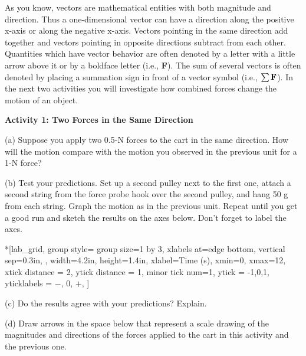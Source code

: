 As you know, vectors are mathematical entities with both magnitude and
direction. Thus a one-dimensional vector can have a direction along the positive
x-axis or along the negative x-axis. Vectors pointing in the same direction
add together and vectors pointing in opposite directions subtract from each
other. Quantities which have vector behavior are often denoted by a letter with
a little arrow above it or by a boldface letter (i.e., \textbf{F}). The sum of
several vectors is often denoted by placing a summation sign in front of a vector
symbol (i.e., \( \sum {\bf F}  \)). In the next two activities you will
investigate how combined forces change the motion of an object.

\textbf{Activity 1: Two Forces in the Same Direction}

(a) Suppose you apply two 0.5-N forces to the cart in the same direction. How
will the motion compare with the motion you observed in the previous unit for
a 1-N force?
\answerspace{20mm}

\pagebreak[3]
(b) Test your predictions. Set up a second pulley next to the first one, attach
a second string from the force probe hook over the second pulley, and hang 50
g from each string. Graph the motion as in the previous unit. Repeat until you
get a good run and sketch the results on the axes below. Don't forget to label
the axes.

\begin{lab_groupplot}*{}[lab_grid,
	group style={
		group size=1 by 3,
		xlabels at=edge bottom,
		vertical sep=0.3in,
		},
	width=4.2in,  height=1.4in,
	xlabel=Time (s),
	xmin=0, xmax=12,
	xtick distance = 2, 
	ytick distance = 1, 
	minor tick num=1,
	ytick = {-1,0,1},
	yticklabels = {$-$, 0, $+$},
	]
\nextgroupplot[
	ymin=-1,ymax=1, 
	ylabel={Velocity (m/s)},
	]
\nextgroupplot[
	ymin=-1,ymax=1, 
	ylabel={Acceleration (m/s$^2$)},
	]
\nextgroupplot[
	ymin=-1,ymax=1, 
	ylabel={Force (N)},
	]
\end{lab_groupplot}

(c) Do the results agree with your predictions? Explain.
\answerspace{30mm}

(d) Draw arrows in the space below that represent a scale drawing of the magnitudes
and directions of the forces applied to the cart in this activity and the previous
one.
\answerspace{30mm}

